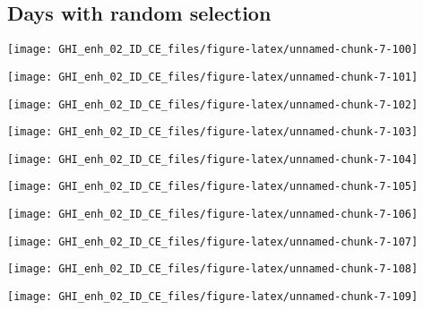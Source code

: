 \documentclass[
  10pt,
  a4paper,oneside]{article}
\begin{document}
\FloatBarrier

\hypertarget{days-with-random-selection}{%
\subsection{Days with random selection}\label{days-with-random-selection}}

\begin{center}\texttt{[image: GHI\_enh\_02\_ID\_CE\_files/figure-latex/unnamed-chunk-7-100]} \end{center}

\begin{center}\texttt{[image: GHI\_enh\_02\_ID\_CE\_files/figure-latex/unnamed-chunk-7-101]} \end{center}

\begin{center}\texttt{[image: GHI\_enh\_02\_ID\_CE\_files/figure-latex/unnamed-chunk-7-102]} \end{center}

\begin{center}\texttt{[image: GHI\_enh\_02\_ID\_CE\_files/figure-latex/unnamed-chunk-7-103]} \end{center}

\begin{center}\texttt{[image: GHI\_enh\_02\_ID\_CE\_files/figure-latex/unnamed-chunk-7-104]} \end{center}

\begin{center}\texttt{[image: GHI\_enh\_02\_ID\_CE\_files/figure-latex/unnamed-chunk-7-105]} \end{center}

\begin{center}\texttt{[image: GHI\_enh\_02\_ID\_CE\_files/figure-latex/unnamed-chunk-7-106]} \end{center}

\begin{center}\texttt{[image: GHI\_enh\_02\_ID\_CE\_files/figure-latex/unnamed-chunk-7-107]} \end{center}

\begin{center}\texttt{[image: GHI\_enh\_02\_ID\_CE\_files/figure-latex/unnamed-chunk-7-108]} \end{center}

\begin{center}\texttt{[image: GHI\_enh\_02\_ID\_CE\_files/figure-latex/unnamed-chunk-7-109]} \end{center}
\end{document}
